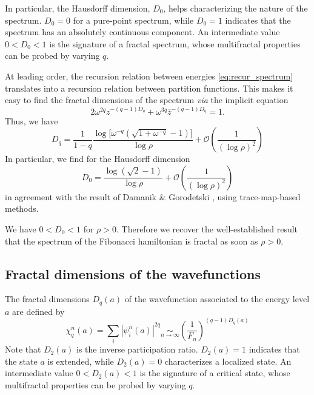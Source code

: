 \documentclass[aps,prl,preprint]{revtex4-1}
\newcommand{\simlim}[2]{\ensuremath{ \underset{#1 \rightarrow #2}{\sim} }}
\newcommand{\zb}{\ensuremath{\overline{z}}}
\begin{document}
In particular, the Hausdorff dimension, $D_0$, helps characterizing the nature of the spectrum. 
$D_0 = 0$ for a pure-point spectrum, while $D_0 = 1$ indicates that the spectrum has an absolutely continuous component.
An intermediate value $0 < D_0 < 1$ is the signature of a fractal spectrum, whose multifractal properties can be probed by varying $q$.

At leading order, the recursion relation between energies \eqref{eq:recur_spectrum} translates into a recursion relation between partition functions. 
This makes it easy to find the fractal dimensions of the spectrum \cite{Piechon95} \emph{via} the implicit equation
\begin{equation}
	2 \omega^{2 q} z^{-(q-1)D_q}+\omega^{3 q} \zb^{-(q-1)D_q} = 1.
\end{equation}
Thus, we have
\begin{equation}
	D_q = \frac{1}{1-q} \frac{\log \big[\omega^{-q} \left( \sqrt{1+\omega^{-q}} -1\right) \big]}{\log \rho} + \mathcal{O}\left( \frac{1}{(\log \rho)^2} \right)
\end{equation}
In particular, we find for the Hausdorff dimension
\begin{equation}
	D_0 = \frac{\log( \sqrt{2} -1 )}{\log \rho} + \mathcal{O}\left( \frac{1}{(\log \rho)^2} \right)
\end{equation}
in agreement with the result of Damanik \& Gorodetski \cite{DamanikGorodetski}, using trace-map-based methods.

We have $0 < D_0 < 1$ for $\rho > 0$. 
Therefore we recover the well-established result that the spectrum of the Fibonacci hamiltonian is fractal as soon as $\rho > 0$.

\subsection{Fractal dimensions of the wavefunctions}

The fractal dimensions $D_q(a)$ of the wavefunction associated to the energy level $a$ are defined by
\begin{equation}
	\chi_q^n(a) = \sum_i |\psi_i^n(a)|^{2q} \simlim{n}{\infty} \left( \frac{1}{F_n} \right)^{(q-1)D_q(a)}
\end{equation}
Note that $D_2(a)$ is the inverse participation ratio.
$D_2(a) = 1$ indicates that the state $a$ is extended, while $D_2(a) = 0$ characterizes a localized state.
An intermediate value $0 < D_2(a) < 1$ is the signature of a critical state, whose multifractal properties can be probed by varying $q$.
\end{document}
